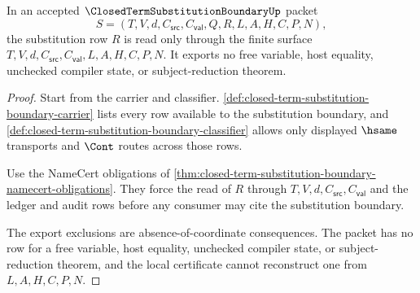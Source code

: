 \begin{theorem}
\label{thm:closed-term-substitution-boundary-substitution-row-exactness}
In an accepted $\ClosedTermSubstitutionBoundaryUp$ packet
$$
S=(T,V,d,C_{\mathsf{src}},C_{\mathsf{val}},Q,R,L,A,H,C,P,N),
$$
the substitution row $R$ is read only through the finite surface $T,V,d,C_{\mathsf{src}},C_{\mathsf{val}},L,A,H,C,P,N$. It exports no free variable, host equality, unchecked compiler state, or subject-reduction theorem.
\end{theorem}
\begin{proof}
Start from the carrier and classifier. \autoref{def:closed-term-substitution-boundary-carrier} lists every row available to the substitution boundary, and \autoref{def:closed-term-substitution-boundary-classifier} allows only displayed $\hsame$ transports and $\Cont$ routes across those rows.

Use the NameCert obligations of \autoref{thm:closed-term-substitution-boundary-namecert-obligations}. They force the read of $R$ through $T,V,d,C_{\mathsf{src}},C_{\mathsf{val}}$ and the ledger and audit rows before any consumer may cite the substitution boundary.

The export exclusions are absence-of-coordinate consequences. The packet has no row for a free variable, host equality, unchecked compiler state, or subject-reduction theorem, and the local certificate cannot reconstruct one from $L,A,H,C,P,N$.
\end{proof}

